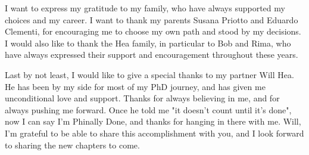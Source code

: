 {    I want to express my gratitude to my family, who have always supported my choices and my career. I want 
    to thank my parents Susana Priotto and Eduardo Clementi, for encouraging me to choose my own path and 
    stood by my decisions. I would also like to thank the Hea family, in particular to Bob and Rima, who 
    have always expressed their support and encouragement throughout these years. 
    
    Last by not least, I would like to give a special thanks to my partner Will Hea. He has been by my side
    for most of my PhD journey, and has given me unconditional love and support. Thanks for always believing 
    in me, and for always pushing me forward. Once he told me "it doesn't count until it's done", now I can 
    say I'm Phinally Done, and thanks for hanging in there with me. Will, I'm grateful to be able to share 
    this accomplishment with you, and I look forward to sharing the new chapters to come.     
}






\showcopyright
\showabstract
\showcommitteepage
\showdedication
\showacknowledgments
\hidepreface
\hideprologue
\hideforeword

